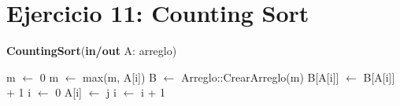 \section{Ejercicio 11: Counting Sort}

\begin{algorithm}[H]
\caption{
    \textbf{CountingSort}(\textbf{in/out} A: arreglo)
}
    \begin{algorithmic}[1]
        \State m $\gets$ 0
            \State m $\gets$ max(m, A[i])
        \EndFor
        \State B $\gets$ Arreglo::CrearArreglo(m)
            \State B[A[i]] $\gets$ B[A[i]] + 1
        \EndFor
        \State i $\gets$ 0
                \State A[i] $\gets$ j
                \State i $\gets$ i + 1
            \EndFor
        \EndFor
    \end{algorithmic}
\end{algorithm}